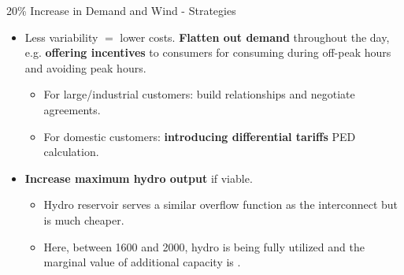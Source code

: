\documentclass{beamer}
\begin{document}
    
    \begin{frame}{20\% Increase in Demand and Wind - Strategies}
    	
        
        
        \begin{itemize}
        
            \item  Less variability $=$ lower costs. \textbf{Flatten out demand} throughout the day, e.g. \textbf{offering incentives} to consumers for consuming during off-peak hours and avoiding peak hours.
            	
                \begin{itemize}
            
            		\item For large/industrial customers: build relationships and negotiate agreements.
            
            		\item For domestic customers: \textbf{introducing differential tariffs} PED calculation.
            
                \end{itemize}
            
            \item \textbf{Increase maximum hydro output} if viable.
            
            	\begin{itemize}
                	
                    \item Hydro reservoir serves a similar overflow function as the interconnect but is much cheaper.
                    
                    \item Here, between 1600 and 2000, hydro is being fully utilized and the marginal value of additional capacity is .
                    
                    
                \end{itemize}   
            
        \end{itemize}
    
    \end{frame}
    
\end{document}
